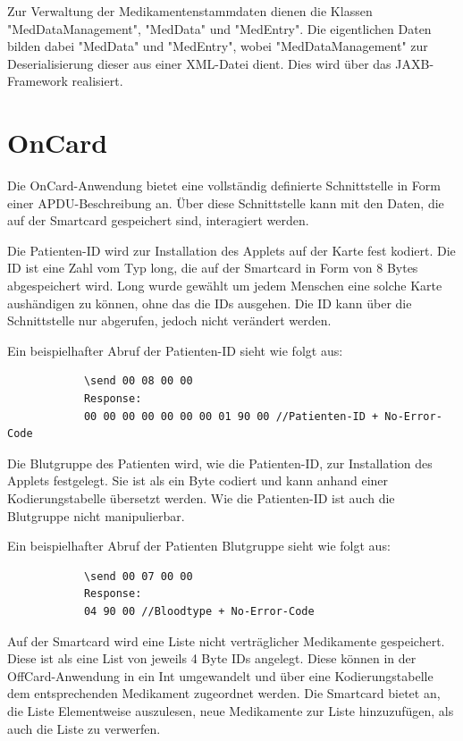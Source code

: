 \documentclass[parskip]{scrartcl}
\begin{document}
		Zur Verwaltung der Medikamentenstammdaten dienen die Klassen "MedDataManagement", "MedData" und "MedEntry". Die eigentlichen Daten bilden dabei "MedData" und "MedEntry", wobei "MedDataManagement" zur Deserialisierung dieser aus einer XML-Datei dient. Dies wird über das JAXB-Framework realisiert.
	
	\section{OnCard}
		Die OnCard-Anwendung bietet eine vollständig definierte Schnittstelle in Form einer APDU-Beschreibung an. Über diese Schnittstelle kann mit den Daten, die auf der Smartcard gespeichert sind, interagiert werden.
		
		Die Patienten-ID wird zur Installation des Applets auf der Karte fest kodiert. Die ID ist eine Zahl vom Typ long, die auf der Smartcard in Form von 8 Bytes abgespeichert wird. Long wurde gewählt um jedem Menschen eine solche Karte aushändigen zu können, ohne das die IDs ausgehen. Die ID kann über die Schnittstelle nur abgerufen, jedoch nicht verändert werden.
		
		Ein beispielhafter Abruf der Patienten-ID sieht wie folgt aus:
		
		\begin{lstlisting}
			\send 00 08 00 00
			Response:
			00 00 00 00 00 00 00 01 90 00 //Patienten-ID + No-Error-Code
		\end{lstlisting}
		
		Die Blutgruppe des Patienten wird, wie die Patienten-ID, zur Installation des Applets festgelegt. Sie ist als ein Byte codiert und kann anhand einer Kodierungstabelle übersetzt werden. Wie die Patienten-ID ist auch die Blutgruppe nicht manipulierbar.
		
		Ein beispielhafter Abruf der Patienten Blutgruppe sieht wie folgt aus:
		
		\begin{lstlisting}
			\send 00 07 00 00
			Response:
			04 90 00 //Bloodtype + No-Error-Code
		\end{lstlisting}
		
		Auf der Smartcard wird eine Liste nicht verträglicher Medikamente gespeichert. Diese ist als eine List von jeweils 4 Byte IDs angelegt. Diese können in der OffCard-Anwendung in ein Int umgewandelt und über eine Kodierungstabelle dem entsprechenden Medikament zugeordnet werden. Die Smartcard bietet an, die Liste Elementweise auszulesen, neue Medikamente zur Liste hinzuzufügen, als auch die Liste zu verwerfen.
		
\end{document}
